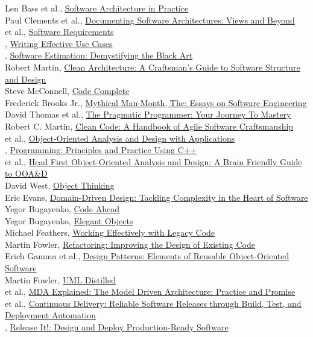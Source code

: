 \documentclass[nobrand,anonymous,nodate,nosecurity]{huawei}
\begin{document}
\begin{multicols}{2}\small\raggedright
Len Bass et al., \ul{Software Architecture in Practice}\\[3pt]
Paul Clements et al., \ul{Documenting Software Architectures: Views and Beyond}\\[3pt]
 et al., \ul{Software Requirements}\\[3pt]
{}, \ul{Writing Effective Use Cases}\\[3pt]
{}, \ul{Software Estimation: Demystifying the Black Art}\\[3pt]
{Robert Martin}, \ul{Clean Architecture: A Craftsman's Guide to Software Structure and Design}\\[3pt]
{Steve McConnell}, \ul{Code Complete}\\[3pt]
{Frederick Brooks Jr.}, \ul{Mythical Man-Month, The: Essays on Software Engineering}\\[3pt]
{David Thomas et al.}, \ul{The Pragmatic Programmer: Your Journey To Mastery}\\[3pt]
{Robert C. Martin}, \ul{Clean Code: A Handbook of Agile Software Craftsmanship}\\[3pt]
{ et al.}, \ul{Object-Oriented Analysis and Design with Applications}\\[3pt]
{}, \ul{Programming: Principles and Practice Using C++}\\[3pt]
{ et al.}, \ul{Head First Object-Oriented Analysis and Design: A Brain Friendly Guide to OOA\&D}\\[3pt]
{David West}, \ul{Object Thinking}\\[3pt]
{Eric Evans}, \ul{Domain-Driven Design: Tackling Complexity in the Heart of Software}\\[3pt]
{Yegor Bugayenko}, \ul{Code Ahead}\\[3pt]
{Yegor Bugayenko}, \ul{Elegant Objects}\\[3pt]
{Michael Feathers}, \ul{Working Effectively with Legacy Code}\\[3pt]
{Martin Fowler}, \ul{Refactoring: Improving the Design of Existing Code}\\[3pt]
{Erich Gamma et al.}, \ul{Design Patterns: Elements of Reusable Object-Oriented Software}\\[3pt]
{Martin Fowler}, \ul{UML Distilled}\\[3pt]
{ et al.}, \ul{MDA Explained: The Model Driven Architecture: Practice and Promise}\\[3pt]
{ et al.}, \ul{Continuous Delivery: Reliable Software Releases through Build, Test, and Deployment Automation}\\[3pt]
{}, \ul{Release It!: Design and Deploy Production-Ready Software}\\[3pt]
\end{multicols}
\end{document}
